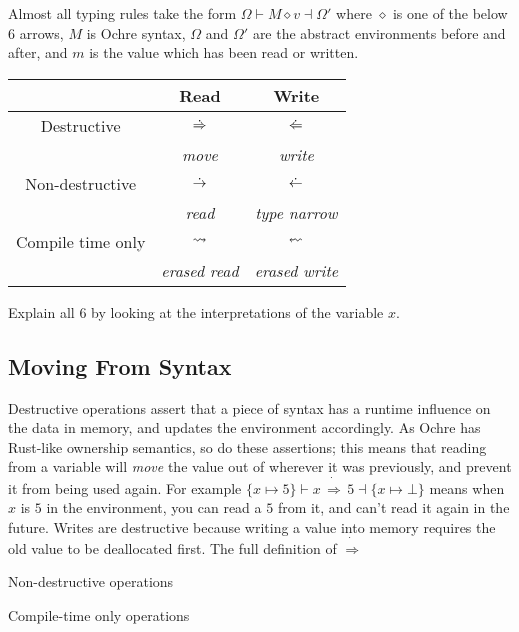 \documentclass[12pt,twoside]{report}
\begin{document}
Almost all typing rules take the form $\Omega \vdash M \diamond v \dashv \Omega'$ where $\diamond$ is one of the below 6 arrows, $M$ is Ochre syntax, $\Omega$ and $\Omega'$ are the abstract environments before and after, and $m$ is the value which has been read or written.

\begin{tabular}{c|c|c}
  & Read & Write \\
  \hline
  Destructive & $\,\dot{\Rightarrow}\,$ & $\,\dot{\Leftarrow}\,$ \\
  & \textit{move} & \textit{write}\\
  Non-destructive & $\,\dot{\rightarrow}\,$ & $\,\dot{\leftarrow}\,$ \\
  & \textit{read} & \textit{type narrow}\\
  Compile time only & $\,\rightsquigarrow\,$ &  $\erasedwritearrow$ \\
  & \textit{erased read} & \textit{erased write}\\
\end{tabular}

Explain all 6 by looking at the interpretations of the variable $x$.

\subsection{Moving From Syntax}
Destructive operations assert that a piece of syntax has a runtime influence on the data in memory, and updates the environment accordingly. As Ochre has Rust-like ownership semantics, so do these assertions; this means that reading from a variable will \textit{move} the value out of wherever it was previously, and prevent it from being used again. For example $\{x \mapsto 5\} \vdash x\,\dot{\Rightarrow}\,5 \dashv \{x \mapsto \bot\}$ means when $x$ is $5$ in the environment, you can read a $5$ from it, and can't read it again in the future. Writes are destructive because writing a value into memory requires the old value to be deallocated first. The full definition of $\dot{\Rightarrow}$

Non-destructive operations

Compile-time only operations
\end{document}
